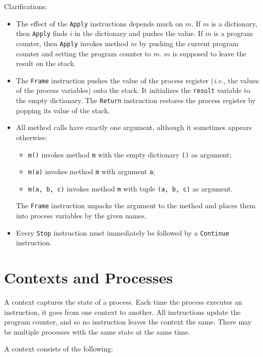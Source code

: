 \documentclass{report}
\begin{document}
\vspace{1em}

Clarifications:
\begin{itemize}
\item The effect of the \texttt{Apply} instructions depends much on $m$.
If $m$ is a dictionary, then \texttt{Apply} finds $i$ in the dictionary
and pushes the value.
If $m$ is a program counter, then \texttt{Apply} invokes method $m$ by
pushing the current program counter and setting the program counter to
$m$.  $m$ is supposed to leave the result on the stack.
\item The \texttt{Frame} instruction pushes the value of the process
register (\emph{i.e.}, the values of the process variables) onto the
stack.  It initializes the \texttt{result} variable to the empty dictionary.
The \texttt{Return} instruction restores the process register by popping
its value of the stack.
\item All method calls have exactly one argument, although it sometimes
appears otherwise:
\begin{itemize}
\item \texttt{m()} invokes method \texttt{m} with the empty dictionary \texttt{()} as argument;
\item \texttt{m(a)} invokes method \texttt{m} with argument \texttt{a};
\item \texttt{m(a, b, c)} invokes method \texttt{m} with tuple \texttt{(a, b, c)} as argument.
\end{itemize}
The \texttt{Frame} instruction unpacks the argument to the method and places them into process variables by the given names.
\item Every \texttt{Stop} instruction must immediately be followed by a 
\texttt{Continue} instruction.
\end{itemize}

\chapter{Contexts and Processes}
\label{app:context}

A context captures the state of a process.  Each time the process
executes an instruction, it goes from one context to another.
All instructions update the program counter, and so no instruction
leaves the context the same.
There may be multiple processes
with the same state at the same time.

A context consists of the following:
\end{document}
